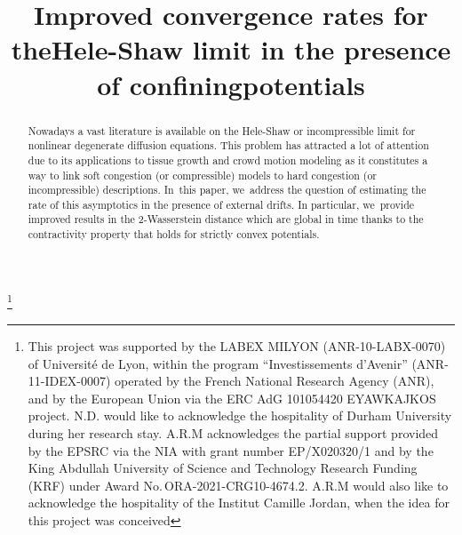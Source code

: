 \documentclass[JEP,XML,SOM,Unicode,published]{cedram}
\theoremstyle{plain}
\theoremstyle{remark}
\begin{document}
\frontmatter

\title{Improved convergence rates for the\nobreakspace Hele-Shaw limit in the presence of confining\nobreakspace potentials}

\author[\initial{N.} \lastname{David}]{ }
\address{CNRS, Laboratoire de Mathématiques Raphaël Salem,\\
Avenue de l'Université, BP.12, 76801, Saint-Étienne-du-Rouvray, France}

\author[\initial{A.} \middlename{R.} \lastname{Mészáros}]{  }
\address{Department of Mathematical Sciences, University of Durham,\\ Durham DH1 3LE, United Kingdom}

\author[\initial{F.} \lastname{Santambrogio}]{ }
\address{Universite Claude Bernard Lyon 1, CNRS, École Centrale de Lyon, INSA Lyon, Université Jean Monnet,
Institut Camille Jordan, UMR5208,\\
43 bd du 11 novembre 1918, 69622 Villeurbanne Cedex}

\thanks{This project was supported by the LABEX MILYON (ANR-10-LABX-0070) of Université de Lyon, within the program ``Investissements d'Avenir'' (ANR-11-IDEX-0007) operated by the French National Research Agency (ANR), and by the European Union via the ERC AdG 101054420 EYAWKAJKOS project.
N.D. would like to acknowledge the hospitality of Durham University during her research stay. A.R.M acknowledges the partial support provided by the EPSRC via the NIA with grant number EP/X020320/1 and by the King Abdullah University of Science and Technology Research Funding (KRF) under Award No.\,ORA-2021-CRG10-4674.2. A.R.M would also like to acknowledge the hospitality of the Institut Camille Jordan, when the idea for this project was conceived}

\begin{abstract}
Nowadays a vast literature is available on the Hele-Shaw or incompressible limit for nonlinear degenerate diffusion equations. This problem has attracted a lot of attention due to its applications to tissue growth and crowd motion modeling as it constitutes a way to link soft congestion (or compressible) models to hard congestion (or incompressible) descriptions. In~this paper, we~address the question of estimating the rate of this asymptotics in the presence of external drifts. In particular, we~provide improved results in the 2-Wasserstein distance which are global in time thanks to the contractivity property that holds for strictly convex potentials.
\end{abstract}
\end{document}
